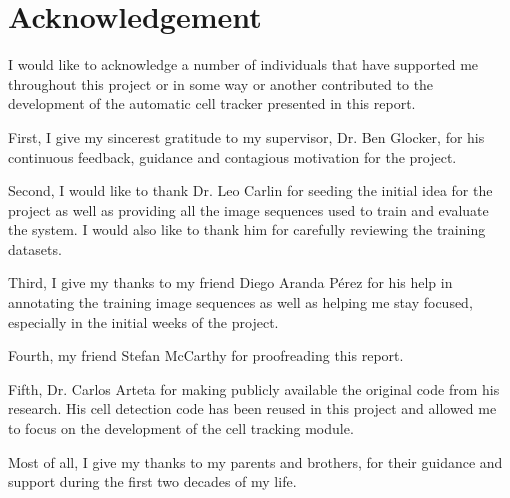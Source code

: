 \chapter*{Acknowledgement}

I would like to acknowledge a number of individuals that have supported me throughout this project or in some way or another contributed to the development of the automatic cell tracker presented in this report.

First, I give my sincerest gratitude to my supervisor, Dr. Ben Glocker, for his continuous feedback, guidance and contagious motivation for the project. 

Second, I would like to thank Dr. Leo Carlin for seeding the initial idea for the project as well as providing all the image sequences used to train and evaluate the system. I would also like to thank him for carefully reviewing the training datasets.

Third, I give my thanks to my friend Diego Aranda Pérez for his help in annotating the training image sequences as well as helping me stay focused, especially in the initial weeks of the project.

Fourth, my friend Stefan McCarthy for proofreading this report.

Fifth, Dr. Carlos Arteta for making publicly available the original code from his research. His cell detection code has been reused in this project and allowed me to focus on the development of the cell tracking module.

Most of all, I give my thanks to my parents and brothers, for their guidance and support during the first two decades of my life.